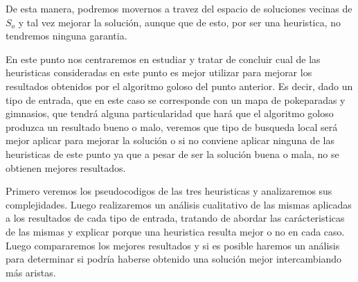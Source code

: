 De esta manera, podremos movernos a travez del espacio de soluciones vecinas de $S_o$ y tal vez mejorar la solución, aunque que de esto, por ser una heuristica, no tendremos ninguna garantia.

En este punto nos centraremos en estudiar y tratar de concluir cual de las heuristicas consideradas en este punto es mejor utilizar para mejorar los resultados obtenidos por el algoritmo goloso del punto anterior. Es decir, dado un tipo de entrada, que en este caso se corresponde con un mapa de pokeparadas y gimnasios, que tendrá alguna particularidad que hará que el algoritmo goloso produzca un resultado bueno o malo, veremos que tipo de busqueda local será mejor aplicar para mejorar la solución o si no conviene aplicar ninguna de las heuristicas de este punto ya que a pesar de ser la solución buena o mala, no se obtienen mejores resultados.

Primero veremos los pseudocodigos de las tres heuristicas y analizaremos sus complejidades. Luego realizaremos un análisis cualitativo de las mismas aplicadas a los resultados de cada tipo de entrada, tratando de abordar las carácteristicas de las mismas y explicar porque una heuristica resulta mejor o no en cada caso. Luego compararemos los mejores resultados y si es posible haremos un análisis para determinar si podría haberse obtenido una solución mejor intercambiando más aristas.
